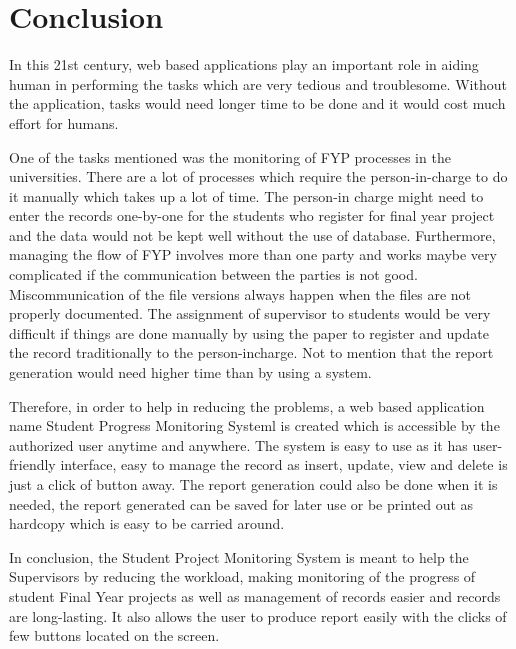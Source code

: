 \documentclass{article}
\begin{document}
\section{Conclusion}
\par In this 21st century, web based applications play an important role in aiding human in performing the tasks which are very tedious and troublesome. Without the application, tasks would need longer time to be done and it would cost much effort for  humans.
\vspace*{8mm}
\par One of the tasks mentioned was the monitoring of FYP processes in the universities. There are a lot of processes which require the person-in-charge to do it manually which takes up a lot of time. The person-in charge might need to enter the records one-by-one for the students who register for final year project and the data would not be kept well without the use of database. Furthermore, managing the flow of FYP involves more than one party and works maybe very complicated if the communication between the parties is not good.
Miscommunication of the file versions always happen when the files are not properly documented. The assignment of supervisor to students would be very difficult if things are done manually by using the paper to register and update the record traditionally to the person-incharge. Not to mention that the report generation would need higher time than by using a system.
\vspace*{8mm}
\par Therefore, in order to help in reducing the problems, a  web based application name Student Progress Monitoring Systeml is created which is accessible by the authorized user anytime and anywhere. The system is easy to use as it has user-friendly interface, easy to manage the record as insert, update, view and delete is just a click of button away. The report generation could also be done when it is needed, the report generated can be saved for later use or be printed out as hardcopy which is easy to be carried around.
\vspace*{8mm}
\par In conclusion, the Student Project Monitoring System  is meant to help the Supervisors by reducing the workload, making monitoring of the progress of student Final Year projects as well as management of records easier and records are long-lasting. It also allows the user to produce report easily with the clicks of few buttons located on the screen.

\vspace*{8mm}
\end{document}
